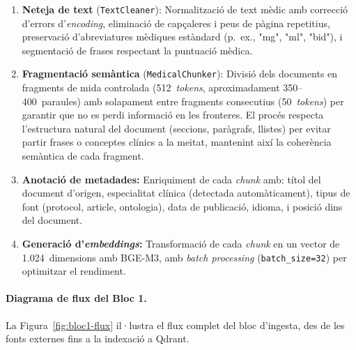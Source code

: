 \documentclass[CAT]{TFUOC}%
\begin{document}
\begin{enumerate}
    \item \textbf{Neteja de text} (\texttt{TextCleaner}): Normalització de text mèdic amb correcció d'errors d'\textit{encoding}, eliminació de capçaleres i peus de pàgina repetitius, preservació d'abreviatures mèdiques estàndard (p.~ex., "mg", "ml", "bid"), i segmentació de frases respectant la puntuació mèdica.
    
    \item \textbf{Fragmentació semàntica} (\texttt{MedicalChunker}): Divisió dels documents en fragments de mida controlada (512~\textit{tokens}, aproximadament 350--400~paraules) amb solapament entre fragments consecutius (50~\textit{tokens}) per garantir que no es perdi informació en les fronteres. El procés respecta l'estructura natural del document (seccions, paràgrafs, llistes) per evitar partir frases o conceptes clínics a la meitat, mantenint així la coherència semàntica de cada fragment.
    
    \item \textbf{Anotació de metadades:} Enriquiment de cada \textit{chunk} amb: títol del document d'origen, especialitat clínica (detectada automàticament), tipus de font (protocol, article, ontologia), data de publicació, idioma, i posició dins del document.
    
    \item \textbf{Generació d'\textit{embeddings}:} Transformació de cada \textit{chunk} en un vector de 1.024~dimensions amb BGE-M3, amb \textit{batch processing} (\texttt{batch\_size=32}) per optimitzar el rendiment.
\end{enumerate}

\paragraph{Diagrama de flux del Bloc 1.}

La Figura~\ref{fig:bloc1-flux} il·lustra el flux complet del bloc d'ingesta, des de les fonts externes fins a la indexació a Qdrant.
\end{document}
